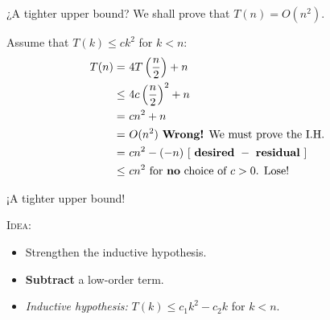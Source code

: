 \documentclass{beamer}
\begin{document}
\begin{frame}{¿A tighter upper bound?}
    We shall prove that $T(n) = O(n^2)$.
    
    \begin{block}{}
        Assume that $T(k) \leq ck^2$ for $k < n$:
        \begin{align*}
            T(n) = & \text{ }4T \left(\frac{n}{2} \right) + n \\
                \leq & \text{ }4c \left(\frac{n}{2} \right)^2 + n \\
                   = & \text{ }cn^2 + n \\
                   = & \text{ }O(n^2) \text{ \textbf{Wrong!} We must prove the I.H. }\\
                   = & \text{ }cn^2 -(-n) \text{ [ \textbf{desired} } - \text{ \textbf{residual} ] }\\
                 \leq& \text{ }cn^2 \text{    for \textbf{no} choice of } c > 0 \text{. Lose!}  
        \end{align*}
    \end{block}
\end{frame}

\begin{frame}{¡A tighter upper bound!}
    \begin{block}{\textsc{Idea}:}
        \begin{itemize}
        \item Strengthen the inductive hypothesis.
         \item \textbf{Subtract} a low-order term.
         \item \textit{Inductive hypothesis:} $T(k) \leq c_1k^2 - c_2k$ for $k < n$.
        \end{itemize}
    \end{block}
\end{frame}
\end{document}
